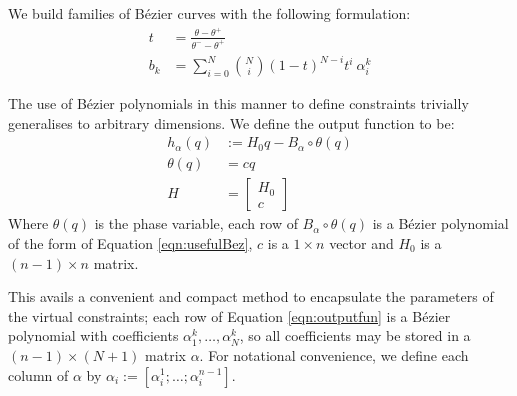 We build families of Bézier curves with the following formulation:
\begin{subequations} \label{eqn:usefulBez}
\begin{align}
	t &= \frac{\theta - \theta^+}{\theta^- - \theta^+} \\
	b_k &= \sum_{i=0}^{N}\binom{N}{i}\left(1-t\right)^{N-i}t^i~\alpha^k_i
\end{align}
\end{subequations}

The use of Bézier polynomials in this manner to define constraints trivially generalises to arbitrary dimensions. We define the output function to be:
\begin{subequations}\label{eqn:outputfun} 
\begin{align} 
	h_\alpha(q) &:= H_0 q - B_\alpha \circ \theta(q) \\
	\theta(q) &= cq \\
	H &= \begin{bmatrix}
		H_0 \\ c
	\end{bmatrix}
\end{align}
\end{subequations}
Where $\theta(q)$ is the phase variable, each row of $B_\alpha\circ\theta(q)$ is a Bézier polynomial of the form of Equation \ref{eqn:usefulBez}, $c$ is a $1\times n$ vector and $H_0$ is a $(n-1)\times n$ matrix.

This avails a convenient and compact method to encapsulate the parameters of the virtual constraints; each row of Equation \ref{eqn:outputfun} is a Bézier polynomial with coefficients $\alpha_1^k, \ldots, \alpha_N^k$, so all coefficients may be stored in a $(n-1)\times(N+1)$ matrix $\alpha$. For notational convenience, we define each column of $\alpha$ by $\alpha_i := [\alpha_i^1; \ldots; \alpha_i^{n-1}]$. %


